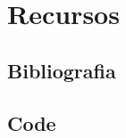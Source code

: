



\newpage



\newpage
\section{Recursos}

\subsection{Bibliografia}
\nocite{*}
\printbibliography[heading=none]




\newpage
\begin{appendices}

\subsection{Code}

\newpage



\end{appendices}


